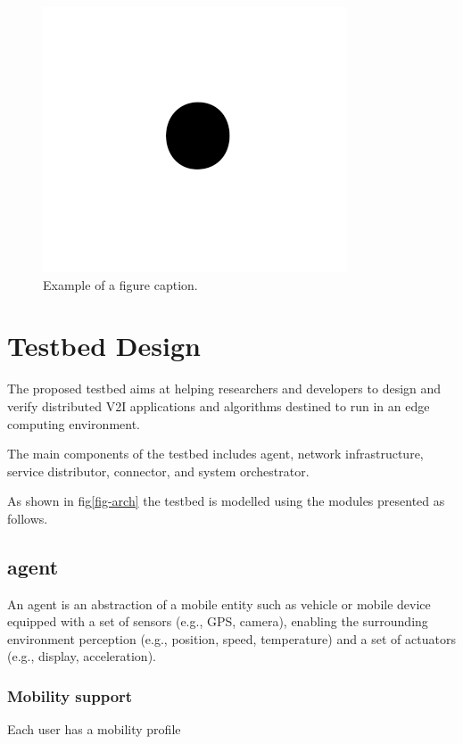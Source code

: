 \documentclass[conference]{IEEEtran}
\begin{document}
\begin{figure}[htbp]
\centerline{\includegraphics{fig1.png}}
\caption{Example of a figure caption.}
\label{fig}
\end{figure}
\section{Testbed Design}
\par The proposed testbed aims at helping researchers and developers to design and verify distributed
V2I applications and algorithms destined to run in an edge computing environment. 

The main components of the testbed includes agent, network infrastructure, service distributor, connector, and system orchestrator.
\par As shown in fig\ref{fig-arch} the testbed is modelled using the modules presented as follows.

\subsection{agent}
\par An agent is an abstraction of a mobile entity such as vehicle or mobile device equipped with a set of sensors (e.g., GPS, camera), enabling the surrounding environment perception (e.g., position, speed, temperature) and a set of actuators (e.g., display, acceleration). 

\subsubsection{Mobility support}
Each user has a mobility profile 
\end{document}
